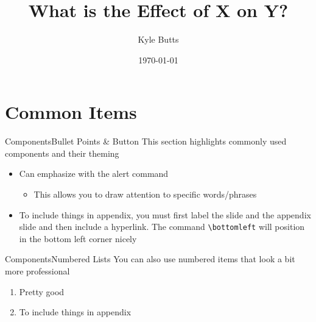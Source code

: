 \documentclass[aspectratio=169,t,11pt,table]{beamer}
\title{What is the Effect of X on Y?}
\date{\today}
\author{Kyle Butts}
\begin{document}
\begin{frame}
\maketitle


\end{frame}

\section{Common Items}

\begin{frame}{Components}{Bullet Points \& Button}\label{main1}
  This section highlights commonly used components and their theming

  \begin{itemize}
    \item Can emphasize with \alert{the alert command}
    
    \begin{itemize}
      \item This allows you to draw attention to specific words/phrases
    \end{itemize}
    
    \item To include things in appendix, you must first label the slide and the appendix slide and then include a hyperlink. The command \texttt{\textbackslash bottomleft} will position in the bottom left corner nicely
  \end{itemize}

\end{frame}


\begin{frame}{Components}{Numbered Lists}
  You can also use numbered items that look a bit more professional

  \begin{enumerate}
    \item Pretty good
    
    \item To include things in appendix
  \end{enumerate}
\end{frame}
\end{document}
